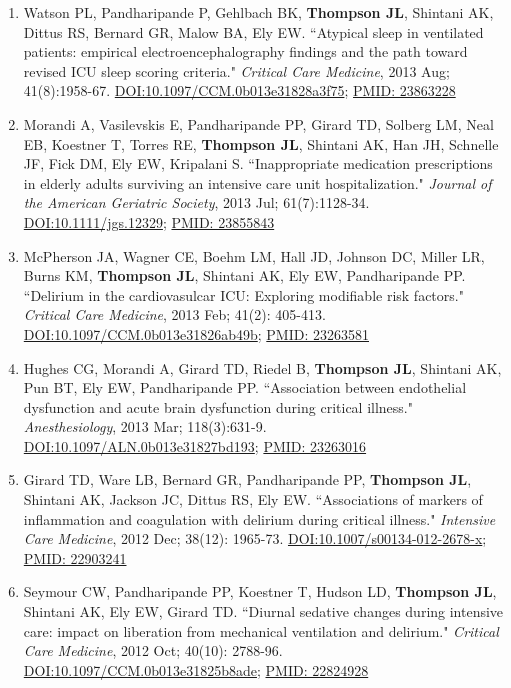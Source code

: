 \documentclass[5pt]{article}
\begin{document}
\begin{enumerate}
\item Watson PL, Pandharipande P, Gehlbach BK, \textbf{Thompson JL}, Shintani AK, Dittus RS, Bernard GR, Malow BA, Ely EW. ``Atypical sleep in ventilated patients: empirical electroencephalography findings and the path toward revised ICU sleep scoring criteria." \emph{Critical Care Medicine}, 2013 Aug; 41(8):1958-67. \href{https://doi.org/10.1097/CCM.0b013e31828a3f75}{DOI:10.1097/CCM.0b013e31828a3f75}; \href{https://www.ncbi.nlm.nih.gov/pubmed/23863228}{PMID: 23863228}
\item Morandi A, Vasilevskis E, Pandharipande PP, Girard TD, Solberg LM, Neal EB, Koestner T, Torres RE, \textbf{Thompson JL}, Shintani AK, Han JH, Schnelle JF, Fick DM, Ely EW, Kripalani S. ``Inappropriate medication prescriptions in elderly adults surviving an intensive care unit hospitalization." \emph{Journal of the American Geriatric Society}, 2013 Jul; 61(7):1128-34. \href{https://doi.org/10.1111/jgs.12329}{DOI:10.1111/jgs.12329}; \href{https://www.ncbi.nlm.nih.gov/pubmed/23855843}{PMID: 23855843}
\item McPherson JA, Wagner CE, Boehm LM, Hall JD, Johnson DC, Miller LR, Burns KM, \textbf{Thompson JL}, Shintani AK, Ely EW, Pandharipande PP. ``Delirium in the cardiovasulcar ICU: Exploring modifiable risk factors." \emph{Critical Care Medicine}, 2013 Feb; 41(2): 405-413. \href{https://doi.org/10.1097/CCM.0b013e31826ab49b}{DOI:10.1097/CCM.0b013e31826ab49b}; \href{https://www.ncbi.nlm.nih.gov/pubmed/23263581}{PMID: 23263581}
\item Hughes CG, Morandi A, Girard TD, Riedel B, \textbf{Thompson JL}, Shintani AK, Pun BT, Ely EW, Pandharipande PP. ``Association between endothelial dysfunction and acute brain dysfunction during critical illness." \emph{Anesthesiology}, 2013 Mar; 118(3):631-9. \href{https://doi.org/10.1097/ALN.0b013e31827bd193}{DOI:10.1097/ALN.0b013e31827bd193}; \href{https://www.ncbi.nlm.nih.gov/pubmed/23263016}{PMID: 23263016}
\item Girard TD, Ware LB, Bernard GR, Pandharipande PP, \textbf{Thompson JL}, Shintani AK, Jackson JC, Dittus RS, Ely EW. ``Associations of markers of inflammation and coagulation with delirium during critical illness." \emph{Intensive Care Medicine}, 2012 Dec; 38(12): 1965-73. \href{https://doi.org/10.1007/s00134-012-2678-x}{DOI:10.1007/s00134-012-2678-x}; \href{https://www.ncbi.nlm.nih.gov/pubmed/22903241}{PMID: 22903241}
\item Seymour CW, Pandharipande PP, Koestner T, Hudson LD, \textbf{Thompson JL}, Shintani AK, Ely EW, Girard TD. ``Diurnal sedative changes during intensive care: impact on liberation from mechanical ventilation and delirium." \emph{Critical Care Medicine}, 2012 Oct; 40(10): 2788-96.\\ \href{https://doi.org/10.1097/CCM.0b013e31825b8ade}{DOI:10.1097/CCM.0b013e31825b8ade}; \href{https://www.ncbi.nlm.nih.gov/pubmed/22824928}{PMID: 22824928}

\end{enumerate}
\end{document}
